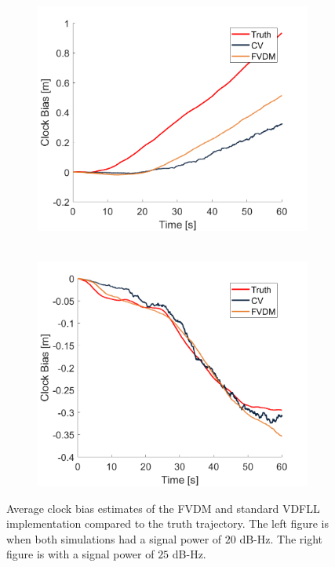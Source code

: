 \begin{figure}[!ht]
    \begin{subfigure}{.45\textwidth}
        \centering
        \includegraphics[width=1\linewidth]{Figures/straight/25/CLOCKBIAS.png}\
    \end{subfigure}
    \begin{subfigure}{.45\textwidth}
        \centering
        \includegraphics[width=1\linewidth]{Figures/straight/35/CLOCKBIAS.png}
    \end{subfigure}
    \caption{Average clock bias estimates of the FVDM and standard VDFLL implementation compared to the truth trajectory. The left figure is when both simulations had a signal power of \(20\) dB-Hz. The right figure is with a signal power of \(25\) dB-Hz.}\label{fig:Clocks1}
\end{figure}

